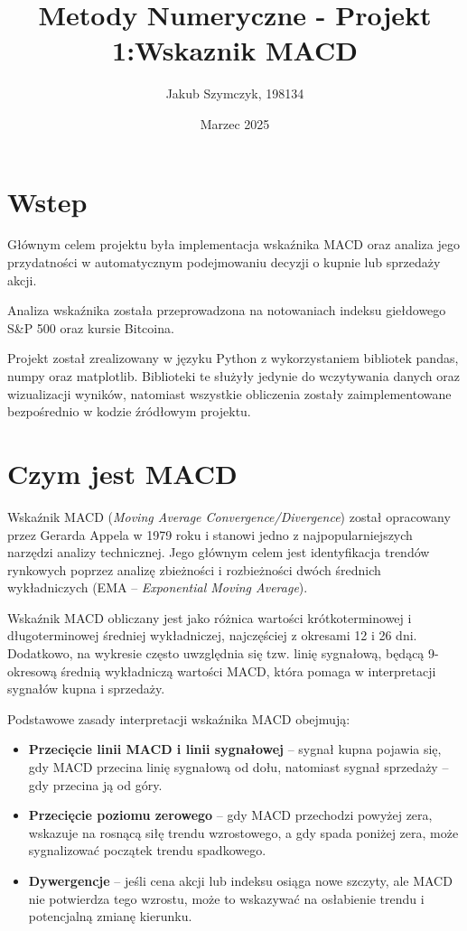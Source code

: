 \documentclass[12pt, letterpaper]{article}
\title{Metody Numeryczne - Projekt 1:\newline Wskaznik MACD}
\author{Jakub Szymczyk, 198134}
\date{Marzec 2025}
\begin{document}
\maketitle

\section{Wstep}
\par
Głównym celem projektu była implementacja wskaźnika MACD oraz analiza jego przydatności w automatycznym podejmowaniu decyzji o kupnie lub sprzedaży akcji.
\bigskip
\par Analiza wskaźnika została przeprowadzona na notowaniach indeksu giełdowego S\&P 500 oraz kursie Bitcoina.
\bigskip
\par Projekt został zrealizowany w języku Python z wykorzystaniem bibliotek pandas, numpy oraz matplotlib. Biblioteki te służyły jedynie do wczytywania danych oraz wizualizacji wyników, natomiast wszystkie obliczenia zostały zaimplementowane bezpośrednio w kodzie źródłowym projektu.
\section{Czym jest MACD}
Wskaźnik MACD (\textit{Moving Average Convergence/Divergence}) został opracowany przez Gerarda Appela w 1979 roku i stanowi jedno z najpopularniejszych narzędzi analizy technicznej. Jego głównym celem jest identyfikacja trendów rynkowych poprzez analizę zbieżności i rozbieżności dwóch średnich wykładniczych (EMA – \textit{Exponential Moving Average}).

\bigskip
Wskaźnik MACD obliczany jest jako różnica wartości krótkoterminowej i długoterminowej średniej wykładniczej, najczęściej z okresami 12 i 26 dni. Dodatkowo, na wykresie często uwzględnia się tzw. linię sygnałową, będącą 9-okresową średnią wykładniczą wartości MACD, która pomaga w interpretacji sygnałów kupna i sprzedaży.

\bigskip
Podstawowe zasady interpretacji wskaźnika MACD obejmują:
\begin{itemize}
\item \textbf{Przecięcie linii MACD i linii sygnałowej} – sygnał kupna pojawia się, gdy MACD przecina linię sygnałową od dołu, natomiast sygnał sprzedaży – gdy przecina ją od góry.
\item \textbf{Przecięcie poziomu zerowego} – gdy MACD przechodzi powyżej zera, wskazuje na rosnącą siłę trendu wzrostowego, a gdy spada poniżej zera, może sygnalizować początek trendu spadkowego.
\item \textbf{Dywergencje} – jeśli cena akcji lub indeksu osiąga nowe szczyty, ale MACD nie potwierdza tego wzrostu, może to wskazywać na osłabienie trendu i potencjalną zmianę kierunku.
\end{itemize}
\end{document}
